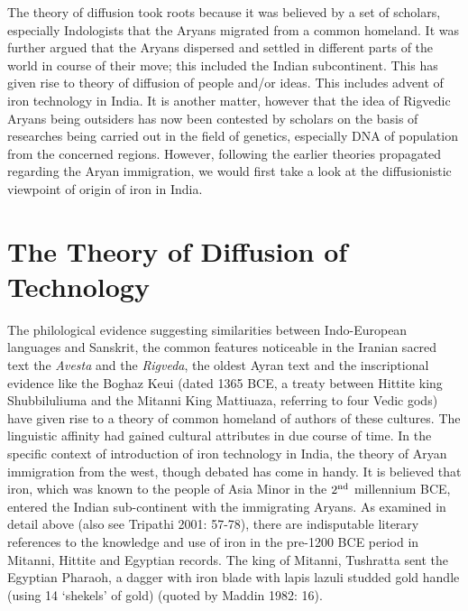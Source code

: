The theory of diffusion took roots because it was believed by a set of scholars, especially Indologists that the Aryans migrated from a common homeland. It was further argued that the Aryans dispersed and settled in different parts of the world in course of their move; this included the Indian subcontinent. This has given rise to theory of diffusion of people and/or ideas. This includes advent of iron technology in India. It is another matter, however that the idea of Rigvedic Aryans being outsiders has now been contested by scholars on the basis of researches being carried out in the field of genetics, especially DNA of population from the concerned regions. However, following the earlier theories propagated regarding the Aryan immigration, we would first take a look at the diffusionistic viewpoint of origin of iron in India.	

\vspace{-.5cm}

\section*{The Theory of Diffusion of Technology}\label{chapter3-section-1}

\vspace{-.2cm}

The philological evidence suggesting similarities between Indo-European languages and Sanskrit, the common features noticeable in the Iranian sacred text the \textit{Avesta} and the \textit{Rigveda}, the oldest Ayran text and the inscriptional evidence like the Boghaz Keui (dated 1365 BCE, a treaty between Hittite king Shubbiluliuma and the Mitanni King Mattiuaza, referring to four Vedic gods) have given rise to a theory of common homeland of authors of these cultures. The linguistic affinity had gained cultural attributes in due course of time. In the specific context of introduction of iron technology in India, the theory of Aryan immigration from the west, though debated has come in handy. It is believed that iron, which was known to the people of Asia Minor in the $2^{\rm nd}$ millennium BCE, entered the Indian sub-continent with the immigrating Aryans. As examined in detail above (also see Tripathi 2001: 57-78), there are indisputable literary references to the knowledge and use of iron in the pre-1200 BCE period in Mitanni, Hittite and Egyptian records. The king of Mitanni, Tushratta sent the Egyptian Pharaoh, a dagger with iron blade with lapis lazuli studded gold handle (using 14 ‘shekels’ of gold) (quoted by Maddin 1982: 16).

